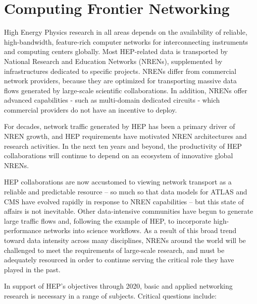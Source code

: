\section{Computing Frontier Networking}


High Energy Physics research in all areas depends on the availability of reliable, high-bandwidth, feature-rich computer networks for interconnecting instruments and computing centers globally. Most HEP-related data is transported by National Research and Education Networks (NRENs), supplemented by infrastructures dedicated to specific projects. NRENs differ from commercial network providers, because they are optimized for transporting massive data flows generated by large-scale scientific collaborations. In addition, NRENs offer advanced capabilities - such as multi-domain dedicated circuits - which commercial providers do not have an incentive to deploy.

For decades, network traffic generated by HEP has been a primary driver of NREN growth, and HEP requirements have motivated NREN architectures and research activities. In the next ten years and beyond, the productivity of HEP collaborations will continue to depend on an ecosystem of innovative global NRENs. 

HEP collaborations are now accustomed to viewing network transport as a reliable and predictable resource – so much so that data models for ATLAS and CMS have evolved rapidly in response to NREN capabilities – but this state of affairs is not inevitable. Other data-intensive communities have begun to generate large traffic flows and, following the example of HEP, to incorporate high-performance networks into science workflows. As a result of this broad trend toward data intensity across many disciplines, NRENs around the world will be challenged to meet the requirements of large-scale research, and must be adequately resourced in order to continue serving the critical role they have played in the past.  

In support of HEP’s objectives through 2020, basic and applied networking research is necessary in a range of subjects. Critical questions include: 

